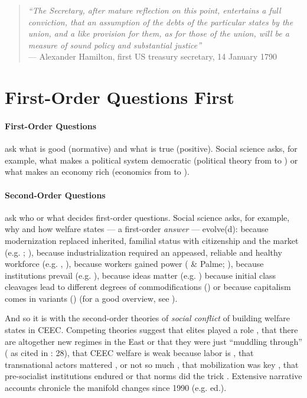 \documentclass[11pt,a4paper,oneside,openright]{article}
\begin{document}
\begin{quote}
	\emph{``The Secretary, after mature reflection on this point, entertains a full conviction, that an assumption of the debts of the particular states by the union, and a like provision for them, as for those of the union, will be a measure of sound policy and substantial justice''\\}
	--- Alexander Hamilton, first US treasury secretary, 14 January 1790
\end{quote}

\newpage

\section{First-Order Questions First}%

\paragraph{First-Order Questions} ask what is good (normative) and what is true (positive). 
Social science asks, for example, what makes a political system democratic (political theory from \citeauthor{Aristoteles} to \citeauthor{Dahl-1989-aa}) or what makes an economy rich (economics from \citeauthor{Smith-1776-lq} to \citeauthor{Hicks1939}).

\paragraph{Second-Order Questions} ask who or what decides first-order questions. 
Social science asks, for example, why and how welfare states --- a first-order \emph{answer} --- evolve(d): 
	because modernization replaced inherited, familial status with citizenship and the market (e.g. \citeauthor{Titmuss1974}; \citeauthor{Marshall-1950-aa}), 
	because industrialization required an appeased, reliable and healthy workforce (e.g. \citeauthor{Flora1981}, \citeauthor{Wilensky1975}), 
	because workers gained power (\citeauthor{Korpi1983} \& Palme; \citeauthor{Jessop2002}), 
	because institutions prevail (e.g. \citeauthor{Rothstein}), 
	because ideas matter (e.g. \citeauthor{Stiller2009}) because initial class cleavages lead to different degrees of commodifications (\citeauthor{Esping-Andersen-1990-aa}) or 
	because capitalism comes in variants (\citeauthor{HallSoskice-2001-aa}) (for a good overview, see \citealt{Beland2008}).

And so it is with the second-order theories of \emph{social conflict} of building welfare states in \gls{CEEC}. 
Competing theories suggest that elites played a role \citep{Aidukaite2006}, 
	that there are altogether new regimes in the East \citep{Cerami2006} or 
	that they were just ``muddling through'' (\citealt{Kovasc} as cited in \citealt{Fuchs2008}: 28), 
	that \gls{CEEC} welfare is weak because labor is \citep{Crowley2002}, 
	that transnational actors mattered \citep{Orenstein2009}, or not so much \citep{Sissenich2005}, 
	that mobilization was key \citep{Vanhuysse2006a}, 
	that pre-socialist institutions endured \citep{Inglot2008} or that norms did the trick \citep{Schimmelfennig2001}. 
Extensive narrative accounts chronicle the manifold changes since 1990 (e.g. \citealt{Deacon1992} ed.). 
\end{document}
